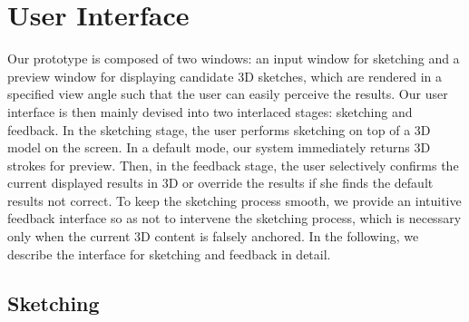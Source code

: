 %
%
%

\section{User Interface}

Our prototype is composed of two windows: an input window for sketching and a preview window for displaying candidate 3{D} sketches, which are rendered in a specified view angle such that the user can easily perceive the results. Our user interface is then mainly devised into two interlaced stages: sketching and feedback. In the sketching stage, the user performs sketching on top of a 3{D} model on the screen. In a default mode, our system immediately returns 3{D} strokes for preview. Then, in the feedback stage, the user selectively confirms the current displayed results in 3{D} or override the results if she finds the default results not correct. To keep the sketching process smooth, we provide an intuitive feedback interface so as not to intervene the sketching process, which is necessary only when the current 3{D} content is falsely anchored.
In the following, we describe the interface for sketching and feedback in detail.

\subsection{Sketching}


